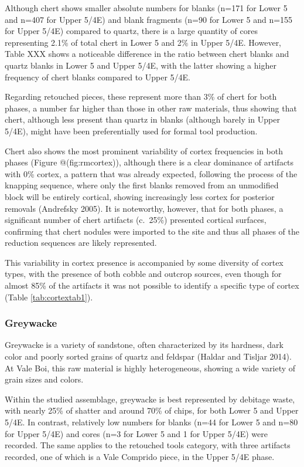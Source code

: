 \documentclass[12pt,twoside]{reedthesis}
\begin{document}
Although chert shows smaller absolute numbers for blanks (n=171 for Lower 5 and n=407 for Upper 5/4E) and blank fragments (n=90 for Lower 5 and n=155 for Upper 5/4E) compared to quartz, there is a large quantity of cores representing 2.1\% of total chert in Lower 5 and 2\% in Upper 5/4E. However, Table XXX shows a noticeable difference in the ratio between chert blanks and quartz blanks in Lower 5 and Upper 5/4E, with the latter showing a higher frequency of chert blanks compared to Upper 5/4E.

Regarding retouched pieces, these represent more than 3\% of chert for both phases, a number far higher than those in other raw materials, thus showing that chert, although less present than quartz in blanks (although barely in Upper 5/4E), might have been preferentially used for formal tool production.

Chert also shows the most prominent variability of cortex frequencies in both phases (Figure @(fig:rmcortex)), although there is a clear dominance of artifacts with 0\% cortex, a pattern that was already expected, following the process of the knapping sequence, where only the first blanks removed from an unmodified block will be entirely cortical, showing increasingly less cortex for posterior removals (Andrefsky 2005). It is noteworthy, however, that for both phases, a significant number of chert artifacts (c.~25\%) presented cortical surfaces, confirming that chert nodules were imported to the site and thus all phases of the reduction sequences are likely represented.

This variability in cortex presence is accompanied by some diversity of cortex types, with the presence of both cobble and outcrop sources, even though for almost 85\% of the artifacts it was not possible to identify a specific type of cortex (Table \ref{tab:cortextab1}).

\hypertarget{greywacke}{%
\subsubsection{Greywacke}\label{greywacke}}

Greywacke is a variety of sandstone, often characterized by its hardness, dark color and poorly sorted grains of quartz and feldspar (Haldar and Tisljar 2014). At Vale Boi, this raw material is highly heterogeneous, showing a wide variety of grain sizes and colors.

Within the studied assemblage, greywacke is best represented by debitage waste, with nearly 25\% of shatter and around 70\% of chips, for both Lower 5 and Upper 5/4E. In contrast, relatively low numbers for blanks (n=44 for Lower 5 and n=80 for Upper 5/4E) and cores (n=3 for Lower 5 and 1 for Upper 5/4E) were recorded. The same applies to the retouched tools category, with three artifacts recorded, one of which is a Vale Comprido piece, in the Upper 5/4E phase.
\end{document}
